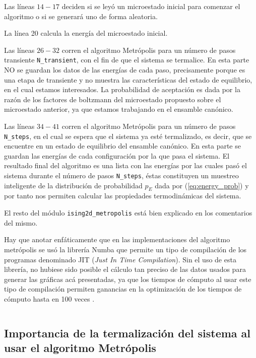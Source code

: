 \documentclass[%
 reprint,
 amsmath,amssymb,
 aps,
 pra,
]{revtex4-2}
\begin{document}
	Las líneas $14-17$ deciden si se leyó un microestado inicial para comenzar el algoritmo o si se generará uno de forma aleatoria.

	La línea 20 calcula la energía del microestado inicial.

	Las líneas $26-32$ corren el algoritmo Metrópolis para un número de pasos transiente \texttt{N_transient}, con el fin de que el sistema se termalice. En esta parte NO se guardan los datos de las energías de cada paso, precisamente porque es una etapa de transiente y no muestra las características del estado de equilibrio, en el cual estamos interesados. La probabilidad de aceptación es dada por la razón de los factores de boltzmann del microestado propuesto sobre el microestado anterior, ya que estamos trabajando en el ensamble canónico.

	Las líneas $34-41$ corren el algoritmo Metrópolis para un número de pasos \texttt{N_steps}, en el cual se espera que el sistema ya esté termalizado, es decir, que se encuentre en un estado de equilibrio del ensamble canónico. En esta parte se guardan las energías de cada configuración por la que pasa el sistema. El resultado final del algoritmo es una lista con las energías por las cuales pasó el sistema durante el número de pasos \texttt{N_steps}, éstas constituyen un muestreo inteligente de la distribución de probabilidad $p_E$ dada por (\ref{eq:energy_prob}) y por tanto nos permiten calcular las propiedades termodinámicas del sistema.
	
	El resto del módulo \texttt{ising2d_metropolis} está bien explicado en los comentarios del mismo.

	Hay que anotar enfáticamente que en las implementaciones del algoritmo metrópolis se usó la librería Numba que permite un tipo de compilación de los programas denominado JIT (\textit{Just In Time Compilation}). Sin el uso de esta librería, no hubiese sido posible el cálculo tan preciso de las datos usados para generar las gráficas acá presentadas, ya que los tiempos de cómputo al usar este tipo de compilación permiten ganancias en la optimización de los tiempos de cómputo hasta en 100 veces \cite{10.1145/2833157.2833162}.

		\inputminted[linenos,breaklines]{python}{ising2d-metropolis-z-retazo.py}


	\subsection{Importancia de la termalización del sistema al usar el algoritmo Metrópolis\label{subsec:metropolis-termalizacion}}
\end{document}
